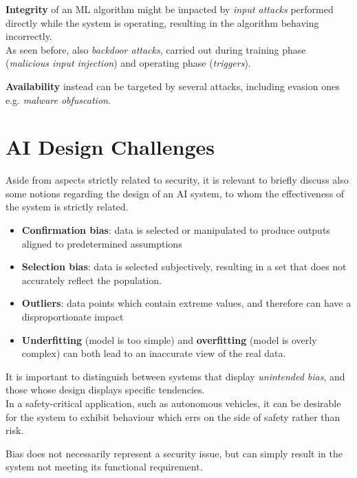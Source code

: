 \textbf{Integrity} of an ML algorithm might be impacted by \textit{input attacks} performed directly while the system is operating, resulting in the algorithm behaving incorrectly.\\
As seen before, also \textit{backdoor attacks}, carried out during training phase (\textit{malicious input injection}) and operating phase (\textit{triggers}).

\textbf{Availability} instead can be targeted by several attacks, including evasion ones e.g. \textit{malware obfuscation}.

\section{AI Design Challenges}
Aside from aspects strictly related to security,
it is relevant to briefly discuss also some notions regarding the design of an AI system, to whom the effectiveness of the system is strictly related.

\begin{itemize}
   \item \textbf{Confirmation bias}: data is selected or manipulated to produce outputs aligned to
   predetermined assumptions
   \item \textbf{Selection bias}: data is selected subjectively, resulting in a set that does not accurately
   reflect the population. 
   \item \textbf{Outliers}: data points which contain extreme values, and therefore can have a
   disproportionate impact
   \item \textbf{Underfitting} (model is too simple) and \textbf{overfitting} (model is overly
   complex) can both lead to an inaccurate view of the real data.
\end{itemize}
It is important to distinguish between systems that display \textit{unintended bias}, and those
whose design displays specific tendencies.\\
In a safety-critical application, such as
autonomous vehicles, it can be desirable for the system to exhibit behaviour which errs on
the side of safety rather than risk.

Bias does not necessarily represent a security issue, but can simply result in the system not meeting its functional requirement.

